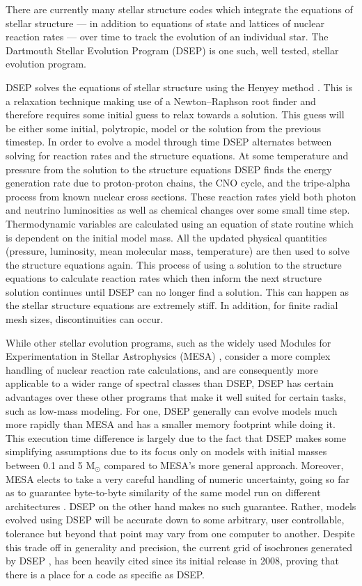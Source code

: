 There are currently many stellar structure codes \citep[e.g.][]{Dotter2008,
Kovetz2009, Paxton2011} which integrate the equations of stellar structure ---
in addition to equations of state and lattices of nuclear reaction rates ---
over time to track the evolution of an individual star. The Dartmouth Stellar
Evolution Program (DSEP) \citep{Chaboyer2001, Bjork2006, Dotter2008} is one
such, well tested, stellar evolution program.

DSEP solves the equations of stellar structure using the Henyey method
\citep{Henyey1964}. This is a relaxation technique making use of a
Newton–Raphson root finder and therefore requires some initial guess to relax
towards a solution. This guess will be either some initial, polytropic, model
or the solution from the previous timestep.  In order to evolve a model through
time DSEP alternates between solving for reaction rates and the structure
equations. At some temperature and pressure from the solution to the structure
equations DSEP finds the energy generation rate due to proton-proton chains,
the CNO cycle, and the tripe-alpha process from known nuclear cross sections.
These reaction rates yield both photon and neutrino luminosities as well as
chemical changes over some small time step. Thermodynamic variables are
calculated using an equation of state routine which is dependent on the initial
model mass. All the updated physical quantities (pressure, luminosity, mean
molecular mass, temperature) are then used to solve the structure equations
again. This process of using a solution to the structure equations to calculate
reaction rates which then inform the next structure solution continues until
DSEP can no longer find a solution.  This can happen as the stellar structure
equations are extremely stiff. In addition, for finite radial mesh sizes,
discontinuities can occur.

While other stellar evolution programs, such as the widely used Modules for
Experimentation in Stellar Astrophysics (MESA) \citep{Paxton2011}, consider a
more complex handling of nuclear reaction rate calculations, and are
consequently more applicable to a wider range of spectral classes than DSEP,
DSEP has certain advantages over these other programs that make it well suited
for certain tasks, such as low-mass modeling. For one, DSEP generally can
evolve models much more rapidly than MESA and has a smaller memory footprint
while doing it. This execution time difference is largely due to the fact that
DSEP makes some simplifying assumptions due to its focus only on models with
initial masses between 0.1 and 5 M$_{\odot}$ compared to MESA’s more general
approach.  Moreover, MESA elects to take a very careful handling of numeric
uncertainty, going so far as to guarantee byte-to-byte similarity of the same
model run on different architectures \citep{Paxton2019}. DSEP on the other hand
makes no such guarantee. Rather, models evolved using DSEP will be accurate
down to some arbitrary, user controllable, tolerance but beyond that point may
vary from one computer to another. Despite this trade off in generality and
precision, the current grid of isochrones generated by DSEP \citep{Dotter2008},
has been heavily cited since its initial release in 2008, proving that there is
a place for a code as specific as DSEP.
